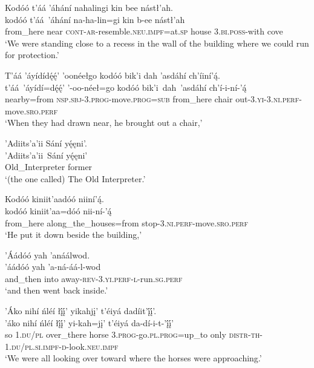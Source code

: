\ea\label{ex:text1-65-9}
Kodóó t’áá ’áhání nahalingi kin bee nástł’ah.\\
\gll kodóó	t’áá~{’áhání}	na-ha-lin=gi	kin	b-ee	nástł’ah\\
     from\_here	near	\textsc{cont}-\textsc{ar}-resemble.\textsc{neu}.\textsc{impf}=at.\textsc{sp}	house	3.\textsc{bi}.\textsc{poss}-with	cove\\
\glt `We were standing close to a recess in the wall of the building where we could run for protection.'
\z

\ea\label{ex:text1-65-10}
T’áá ’áyídídę́ę́’ ’oonéełgo kodóó bik’i dah ’asdáhí ch’íiní’ą́.\\
\gll t’áá~{’áyídí=dę́ę́’}	’-oo-néeł=go	kodóó	bik’i~dah~{’asdáhí}	ch’í-i-ní-’ą́\\
     nearby=from	\textsc{nsp}.\textsc{sbj}-3.\textsc{prog}-move.\textsc{prog}=\textsc{sub}	from\_here	chair	out-3.\textsc{yi}-3.\textsc{ni}.\textsc{perf}-move.\textsc{sro}.\textsc{perf}\\
\glt `When they had drawn near, he brought out a chair,'
\z

\ea\label{ex:text1-65-11}
’Adiits’a’ii Sání yę́ęni’.\\
\gll ’Adiits’a’ii~{Sání}	yę́ęni’\\
     Old\_Interpreter	former\\
\glt `(the one called) The Old Interpreter.'
\z

\ea\label{ex:text1-65-12}
Kodóó kiniit’aadóó niiní’ą́.\\
\gll kodóó	kiniit’aa=dóó	nii-ní-’ą́\\
     from\_here	along\_the\_houses=from	stop-3.\textsc{ni}.\textsc{perf}-move.\textsc{sro}.\textsc{perf}\\
\glt `He put it down beside the building,'
\z

\ea\label{ex:text1-65-13}
’Áádóó yah ’anáálwod.\\
\gll ’áádóó	yah	’a-ná-áá-l-wod\\
     and\_then	into	away-\textsc{rev}-3.\textsc{yi}.\textsc{perf}-\textsc{l}-run.\textsc{sg}.\textsc{perf}\\
\glt `and then went back inside.'
\z

\ea\label{ex:text1-65-14}
’Áko nihí ńléí łį́į́’ yikahjį’ t’éiyá dadíit’į́į́’.\\
\gll ’áko	nihí	ńléí	łį́į́’	yi-kah=jį’	t’éiyá	da-dí-i-t-’į́į́’\\
     so	1.\textsc{du}/\textsc{pl}	over\_there	horse	3.\textsc{prog}-go.\textsc{pl}.\textsc{prog}=up\_to	only	\textsc{distr}-\textsc{th}-1.\textsc{du}/\textsc{pl}.\textsc{si}.\textsc{impf}-\textsc{d}-look.\textsc{neu}.\textsc{impf}\\
\glt `We were all looking over toward where the horses were approaching.'
\z

